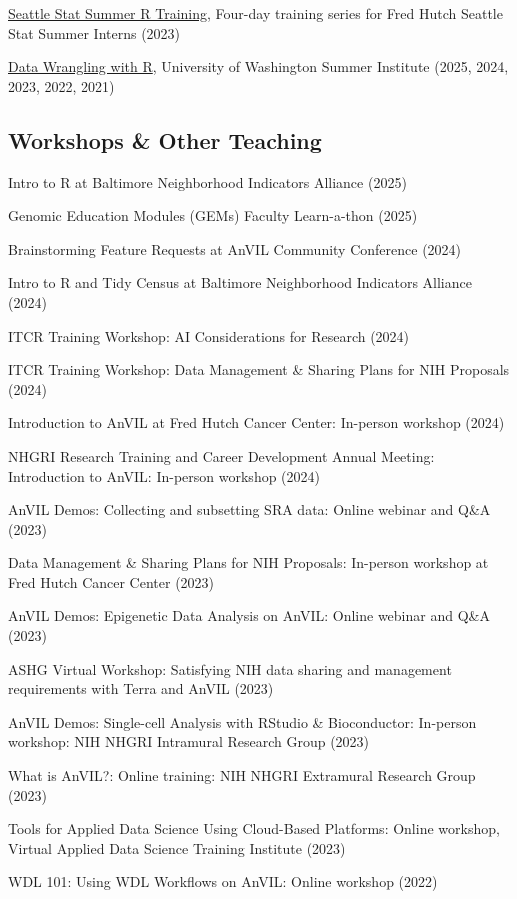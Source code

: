 \documentclass{cv}
\begin{document}
\href{https://hutchdatascience.org/SeattleStatSummer_R}{Seattle Stat Summer R Training}, Four-day training series for Fred Hutch Seattle Stat Summer Interns (2023)

\href{http://sisbid.github.io/Data-Wrangling/}{Data Wrangling with R}, University of Washington Summer Institute (2025, 2024, 2023, 2022, 2021)

\subsection*{Workshops \& Other Teaching}

Intro to R at Baltimore Neighborhood Indicators Alliance (2025)

Genomic Education Modules (GEMs) Faculty Learn-a-thon (2025)

Brainstorming Feature Requests at AnVIL Community Conference (2024)

Intro to R and Tidy Census at Baltimore Neighborhood Indicators Alliance (2024)

ITCR Training Workshop: AI Considerations for Research (2024)

ITCR Training Workshop: Data Management \& Sharing Plans for NIH Proposals (2024)

Introduction to AnVIL at Fred Hutch Cancer Center: In-person workshop (2024)

NHGRI Research Training and Career Development Annual Meeting: Introduction to AnVIL: In-person workshop (2024)

AnVIL Demos: Collecting and subsetting SRA data: Online webinar and Q\&A (2023)

Data Management \& Sharing Plans for NIH Proposals: In-person workshop at Fred Hutch Cancer Center (2023)

AnVIL Demos: Epigenetic Data Analysis on AnVIL: Online webinar and Q\&A (2023)

ASHG Virtual Workshop: Satisfying NIH data sharing and management requirements with Terra and AnVIL (2023)

AnVIL Demos: Single-cell Analysis with RStudio \& Bioconductor: In-person workshop: NIH NHGRI Intramural Research Group (2023)

What is AnVIL?: Online training: NIH NHGRI Extramural Research Group (2023)

Tools for Applied Data Science Using Cloud-Based Platforms: Online workshop, Virtual Applied Data Science Training Institute (2023)

WDL 101: Using WDL Workflows on AnVIL: Online workshop (2022)
\end{document}
